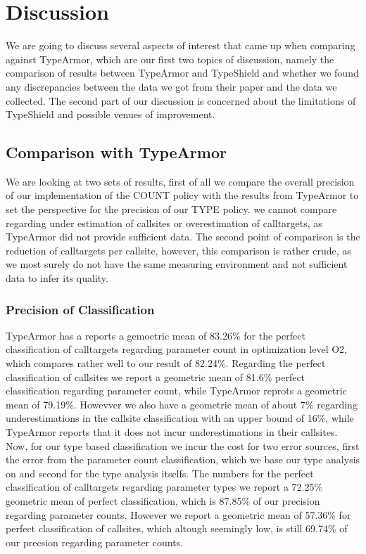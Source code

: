 \chapter{Discussion}
\label{chapter:Discussion}

We are going to discuss several aspects of interest that came up when comparing against TypeArmor, which are our first two topics of discussion, namely the comparison of results between TypeArmor and TypeShield and whether we found any discrepancies between the data we got from their paper and the data we collected. The second part of our discussion is concerned about the limitations of TypeShield and possible venues of improvement.

\section{Comparison with TypeArmor}
We are looking at two sets of results, first of all we compare the overall precision of our implementation of the COUNT policy with the results from TypeArmor to set the perspective for the precision of our TYPE policy. we cannot compare regarding under estimation of callsites or overestimation of calltargets, as TypeArmor did not provide sufficient data. The second point of comparison is the reduction of calltargets per callsite, however, this comparison is rather crude, as we most surely do not have the same measuring environment and not sufficient data to infer its quality.

\subsection{Precision of Classification}
TypeArmor has a reports a gemoetric mean of 83.26\% for the perfect classification of calltargets regarding parameter count in optimization level O2, which compares rather well to our result of 82.24\%. Regarding the perfect classification of callsites we report a geometric mean of 81.6\% perfect classification regarding parameter count, while TypeArmor reprots a geometric mean of 79.19\%. Howevver we also have a geometric mean of about 7\% regarding underestimations in the callsite classification with an upper bound of 16\%, while TypeArmor reports that it does not incur underestimations in their callsites.
Now, for our type based classification we incur the cost for two error sources, first the error from the parameter count classification, which we base our type analysis on and second for the type analysis itselfs. The numbers for the perfect classification of calltargets regarding parameter types we report a 72.25\% geometric mean of perfect classification, which is 87.85\% of our precision regarding parameter counts. However we report a geometric mean of 57.36\%
for perfect classification of callsites, which altough seemingly low, is still 69.74\% of our precsion regarding parameter counts.

